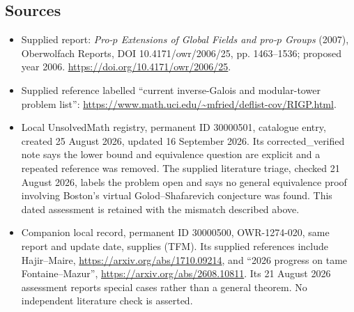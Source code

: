 \documentclass[11pt]{article}
\begin{document}
\subsection{Sources}
\begin{itemize}
\item Supplied report: \emph{Pro-$p$ Extensions of Global Fields and pro-$p$ Groups} (2007), Oberwolfach Reports, DOI 10.4171/owr/2006/25, pp. 1463--1536; proposed year 2006. \url{https://doi.org/10.4171/owr/2006/25}.
\item Supplied reference labelled ``current inverse-Galois and modular-tower problem list'': \url{https://www.math.uci.edu/~mfried/deflist-cov/RIGP.html}.
\item Local UnsolvedMath registry, permanent ID 30000501, catalogue entry, created 25 August 2026, updated 16 September 2026. Its corrected\_verified note says the lower bound and equivalence question are explicit and a repeated reference was removed. The supplied literature triage, checked 21 August 2026, labels the problem open and says no general equivalence proof involving Boston's virtual Golod--Shafarevich conjecture was found. This dated assessment is retained with the mismatch described above.
\item Companion local record, permanent ID 30000500, OWR-1274-020, same report and update date, supplies (TFM). Its supplied references include Hajir--Maire, \url{https://arxiv.org/abs/1710.09214}, and ``2026 progress on tame Fontaine--Mazur'', \url{https://arxiv.org/abs/2608.10811}. Its 21 August 2026 assessment reports special cases rather than a general theorem. No independent literature check is asserted.
\end{itemize}
\end{document}
